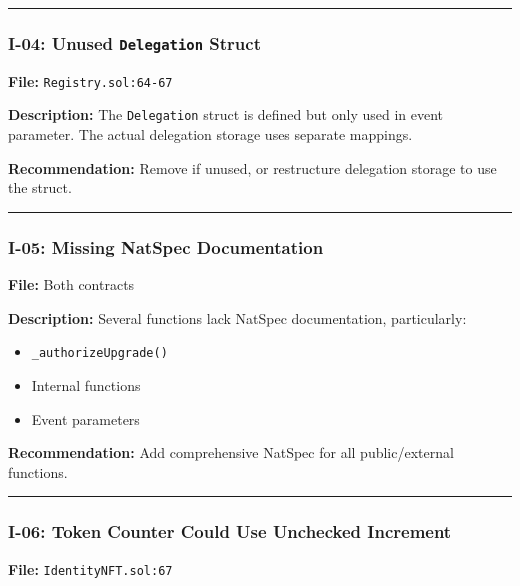 \documentclass[
]{article}
\providecommand{\tightlist}{%
  \setlength{\itemsep}{0pt}\setlength{\parskip}{0pt}}
\begin{document}
\begin{center}\rule{0.5\linewidth}{0.5pt}\end{center}

\subsubsection{\texorpdfstring{I-04: Unused \texttt{Delegation}
Struct}{I-04: Unused Delegation Struct}}\label{i-04-unused-delegation-struct}

\textbf{File:} \texttt{Registry.sol:64-67}

\textbf{Description:} The \texttt{Delegation} struct is defined but only
used in event parameter. The actual delegation storage uses separate
mappings.

\textbf{Recommendation:} Remove if unused, or restructure delegation
storage to use the struct.

\begin{center}\rule{0.5\linewidth}{0.5pt}\end{center}

\subsubsection{I-05: Missing NatSpec
Documentation}\label{i-05-missing-natspec-documentation}

\textbf{File:} Both contracts

\textbf{Description:} Several functions lack NatSpec documentation,
particularly:

\begin{itemize}
\tightlist
\item
  \texttt{\_authorizeUpgrade()}
\item
  Internal functions
\item
  Event parameters
\end{itemize}

\textbf{Recommendation:} Add comprehensive NatSpec for all
public/external functions.

\begin{center}\rule{0.5\linewidth}{0.5pt}\end{center}

\subsubsection{I-06: Token Counter Could Use Unchecked
Increment}\label{i-06-token-counter-could-use-unchecked-increment}

\textbf{File:} \texttt{IdentityNFT.sol:67}
\end{document}

